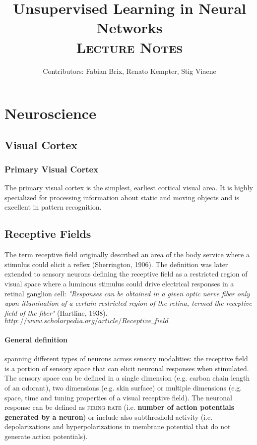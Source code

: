 \documentclass[11pt]{article}
\title{Unsupervised Learning in Neural Networks\\\Huge \textsc{Lecture Notes}}
\author{Contributors: Fabian Brix, Renato Kempter, Stig Viaene}
\begin{document}
\maketitle
\tableofcontents

\section{Neuroscience}

\subsection{Visual Cortex}

\subsubsection{Primary Visual Cortex}
The primary visual cortex is the simplest, earliest cortical visual area. It is highly specialized for processing information about static and moving objects and is excellent in pattern recognition.

\subsection{Receptive Fields}
The term receptive field originally described an area of the body service where a stimulus could elicit a reflex (Sherrington, 1906). The definition was later extended to sensory neurons defining the receptive field as a restricted region of visual space where a luminous stimulus could drive electrical responses in a retinal ganglion cell: \textit{"Responses can be obtained in a given optic nerve fiber only upon illumination of a certain restricted region of the retina, termed the receptive field of the fiber"} (Hartline, 1938).
$http://www.scholarpedia.org/article/Receptive\_field$
\paragraph*{General definition} spanning different types of neurons across sensory modalities: the receptive field is a portion of sensory space that can elicit neuronal responses when stimulated. The sensory space can be defined in a single dimension (e.g. carbon chain length of an odorant), two dimensions (e.g. skin surface) or multiple dimensions (e.g. space, time and tuning properties of a visual receptive field). The neuronal response can be defined as \textsc{firing rate} (i.e. \textbf{number of action potentials generated by a neuron}) or include also subthreshold activity (i.e. depolarizations and hyperpolarizations in membrane potential that do not generate action potentials).
\end{document}
